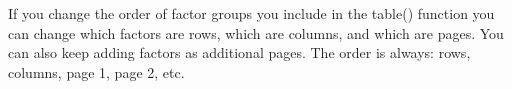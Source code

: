 \documentclass[
  12pt,
  letterpaper]{article}
\newenvironment{Shaded}{\begin{snugshade}}{\end{snugshade}}
\newcommand{\AttributeTok}[1]{\textcolor[rgb]{0.40,0.45,0.13}{#1}}
\newcommand{\CommentTok}[1]{\textcolor[rgb]{0.37,0.37,0.37}{#1}}
\newcommand{\DecValTok}[1]{\textcolor[rgb]{0.68,0.00,0.00}{#1}}
\newcommand{\FunctionTok}[1]{\textcolor[rgb]{0.28,0.35,0.67}{#1}}
\newcommand{\NormalTok}[1]{\textcolor[rgb]{0.00,0.23,0.31}{#1}}
\newcommand{\SpecialCharTok}[1]{\textcolor[rgb]{0.37,0.37,0.37}{#1}}
\renewcommand\texttt[1]{{\ttfamily\color{BrickRed}#1}}
\begin{document}
If you change the order of factor groups you include in the
\texttt{table()} function you can change which factors are rows, which
are columns, and which are pages. You can also keep adding factors as
additional pages. The order is always: rows, columns, page 1, page 2,
etc.

\begin{Shaded}
\end{Shaded}
\end{document}
